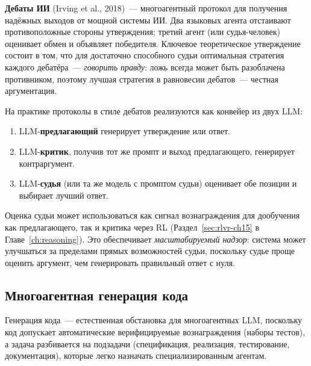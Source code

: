 \textbf{Дебаты ИИ} (Irving et al., 2018)~---
многоагентный протокол для получения надёжных выходов от
мощной системы ИИ. Два языковых агента отстаивают противоположные стороны
утверждения; третий агент (или судья-человек) оценивает
обмен и объявляет победителя. Ключевое теоретическое утверждение состоит в том, что
для достаточно способного судьи оптимальная стратегия каждого дебатёра~---
\emph{говорить правду}: ложь всегда может быть разоблачена
противником, поэтому лучшая стратегия в равновесии дебатов~--- честная аргументация.

На практике протоколы в стиле дебатов реализуются как конвейер из двух LLM:
\begin{enumerate}[leftmargin=*]
  \item LLM-\textbf{предлагающий} генерирует утверждение или ответ.
  \item LLM-\textbf{критик}, получив тот же промпт и выход
    предлагающего, генерирует контраргумент.
  \item LLM-\textbf{судья} (или та же модель с промптом судьи)
    оценивает обе позиции и выбирает лучший ответ.
\end{enumerate}
Оценка судьи может использоваться как сигнал вознаграждения для дообучения как
предлагающего, так и критика через RL (Раздел~\ref{sec:rlvr-ch15} в
Главе~\ref{ch:reasoning}). Это обеспечивает \emph{масштабируемый надзор}:
система может улучшаться за пределами прямых возможностей судьи,
поскольку судье проще оценить аргумент, чем
генерировать правильный ответ с нуля.

\subsection{Многоагентная генерация кода}

Генерация кода~--- естественная обстановка для многоагентных LLM, поскольку
код допускает автоматические верифицируемые вознаграждения (наборы тестов), а
задача разбивается на подзадачи (спецификация, реализация,
тестирование, документация), которые легко назначать специализированным агентам.


